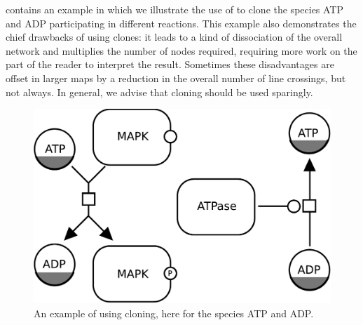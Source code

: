  contains an example in which we illustrate the use of  to clone the species ATP and ADP participating in different reactions.  This example also demonstrates the chief drawbacks of using clones: it leads to a kind of dissociation of the overall network and multiplies the number of nodes required, requiring more work on the part of the reader to interpret the result.  Sometimes these disadvantages are offset in larger maps by a reduction in the overall number of line crossings, but not always.  In general, we advise that cloning should be used sparingly.

\begin{figure}[H]
  \centering
  \includegraphics[scale = 0.5]{examples/cloning}
  \caption{An example of using cloning, here for the species ATP and ADP.}
  \label{fig:example-cloning}
\end{figure}




